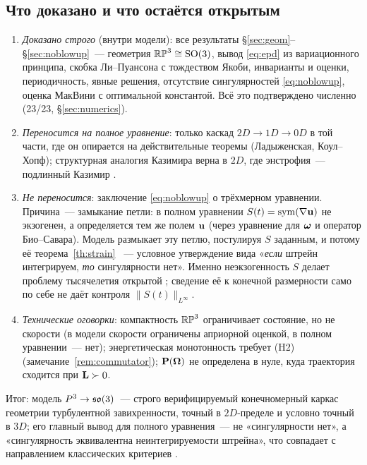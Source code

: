 \subsection{Что доказано и что остаётся открытым}

\begin{enumerate}[label=\textup{(\arabic*)}, leftmargin=2.2em, itemsep=2pt]
  \item \emph{Доказано строго} (внутри модели): все результаты
        \S\ref{sec:geom}--\S\ref{sec:noblowup}~--- геометрия
        $\mathbb{RP}^3\cong\mathrm{SO}(3)$, вывод \eqref{eq:epd} из
        вариационного принципа, скобка Ли--Пуансона с тождеством
        Якоби, инварианты и оценки, периодичность, явные решения,
        отсутствие сингулярностей \eqref{eq:noblowup}, оценка МакВини
        с оптимальной константой. Всё это подтверждено численно
        (23/23, \S\ref{sec:numerics}).
  \item \emph{Переносится на полное уравнение}: только каскад
        $2D \to 1D \to 0D$ в той части, где он опирается на
        действительные теоремы (Ладыженская, Коул--Хопф); структурная
        аналогия Казимира верна в $2D$, где энстрофия~--- подлинный
        Казимир \cite{arnoldkhesin}.
  \item \emph{Не переносится}: заключение \eqref{eq:noblowup} о
        трёхмерном уравнении. Причина~--- замыкание петли: в полном
        уравнении $S(t) = \operatorname{sym}(\nabla\mathbf{u})$ не экзогенен,
        а определяется тем же полем $\mathbf{u}$ (через уравнение для
        $\boldsymbol{\omega}$ и оператор Био--Савара). Модель размыкает эту петлю,
        постулируя $S$ заданным, и потому её теорема~\ref{th:strain}
       ~--- условное утверждение вида «\emph{если} штрейн
        интегрируем, \emph{то} сингулярности нет». Именно
        неэкзогенность $S$ делает проблему тысячелетия открытой
        \cite{fefferman,ckn,bkm}; сведение её к конечной размерности
        само по себе не даёт контроля $\|S(t)\|_{L^\infty}$.
  \item \emph{Технические оговорки}: компактность $\mathbb{RP}^3$
        ограничивает состояние, но не скорости (в модели скорости
        ограничены априорной оценкой, в полном уравнении~--- нет);
        энергетическая монотонность требует \textup{(H2)}
        (замечание~\ref{rem:commutator}); $\mathbf{P}(\boldsymbol{\Omega})$ не определена в
        нуле, куда траектория сходится при $\mathbf{L} \succ 0$.
\end{enumerate}

Итог: модель $P^3 \to \mathfrak{so}(3)$~--- строго верифицируемый конечномерный
каркас геометрии турбулентной завихренности, точный в $2D$-пределе и
условно точный в $3D$; его главный вывод для полного уравнения~---
не «сингулярности нет», а «сингулярность эквивалентна
неинтегрируемости штрейна», что совпадает с направлением классических
критериев \cite{bkm,ckn}.
